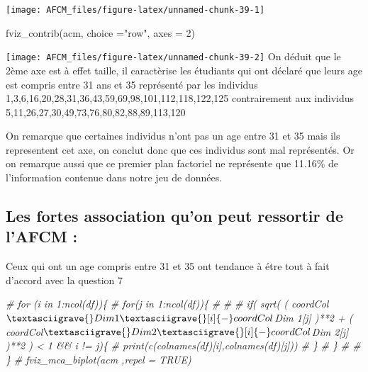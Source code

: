 \documentclass[
]{article}
\newenvironment{Shaded}{\begin{snugshade}}{\end{snugshade}}
\newcommand{\AttributeTok}[1]{\textcolor[rgb]{0.77,0.63,0.00}{#1}}
\newcommand{\CommentTok}[1]{\textcolor[rgb]{0.56,0.35,0.01}{\textit{#1}}}
\newcommand{\DecValTok}[1]{\textcolor[rgb]{0.00,0.00,0.81}{#1}}
\newcommand{\FunctionTok}[1]{\textcolor[rgb]{0.00,0.00,0.00}{#1}}
\newcommand{\NormalTok}[1]{#1}
\newcommand{\StringTok}[1]{\textcolor[rgb]{0.31,0.60,0.02}{#1}}
\begin{document}
\texttt{[image: AFCM\_files/figure-latex/unnamed-chunk-39-1]}

\begin{Shaded}
\begin{Highlighting}[]
\FunctionTok{fviz\_contrib}\NormalTok{(acm, }\AttributeTok{choice =}\StringTok{"row"}\NormalTok{, }\AttributeTok{axes =} \DecValTok{2}\NormalTok{)}
\end{Highlighting}
\end{Shaded}

\texttt{[image: AFCM\_files/figure-latex/unnamed-chunk-39-2]}
On déduit que le 2ème axe est à effet taille, il caractèrise les
étudiants qui ont déclaré que leurs age est compris entre 31 ans et 35
représenté par les individus
1,3,6,16,20,28,31,36,43,59,69,98,101,112,118,122,125 contrairement aux
individus 5,11,26,27,30,49,73,76,80,82,88,89,113,120

On remarque que certaines individus n'ont pas un age entre 31 et 35 mais
ils representent cet axe, on conclut donc que ces individus sont mal
représentés. Or on remarque aussi que ce premier plan factoriel ne
représente que 11.16\% de l'information contenue dans notre jeu de
données.

\hypertarget{les-fortes-association-quon-peut-ressortir-de-lafcm}{%
\subsection{Les fortes association qu'on peut ressortir de l'AFCM
:}\label{les-fortes-association-quon-peut-ressortir-de-lafcm}}

Ceux qui ont un age compris entre 31 et 35 ont tendance à étre tout à
fait d'accord avec la question 7

\begin{Shaded}
\begin{Highlighting}[]
\CommentTok{\# for (i in 1:ncol(df))\{}
\CommentTok{\#   for(j in 1:ncol(df))\{}
\CommentTok{\#     }
\CommentTok{\#     }
\CommentTok{\#     if( sqrt( ( coordCol$\textasciigrave{}Dim 1\textasciigrave{}[i] {-} coordCol$\textasciigrave{}Dim 1\textasciigrave{}[j] )**2 + ( coordCol$\textasciigrave{}Dim 2\textasciigrave{}[i] {-} coordCol$\textasciigrave{}Dim 2\textasciigrave{}[j] )**2 )  \textless{} 1 \&\& i != j)\{}
\CommentTok{\#       print(c(colnames(df)[i],colnames(df)[j]))}
\CommentTok{\#     \}}
\CommentTok{\#   \}}
\CommentTok{\# \# \}}
\CommentTok{\# fviz\_mca\_biplot(acm ,repel = TRUE)}
\end{Highlighting}
\end{Shaded}
\end{document}
